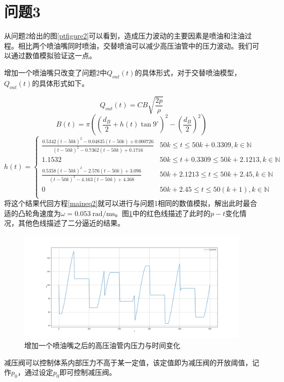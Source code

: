 \documentclass[12pt,AutoFakeBold]{article}%
\begin{document}
    \section{问题3}
    从问题2给出的图\ref{ptfigure2}可以看到，造成压力波动的主要因素是喷油和注油过程。相比两个喷油嘴同时喷油，交替喷油可以减少高压油管中的压力波动。我们可以通过数值模拟验证这一点。\par
    增加一个喷油嘴只改变了问题2中$Q_{out}(t)$的具体形式，对于交替喷油模型，$Q_{out}(t)$的具体形式如下。\par
    \begin{equation}
        Q_{out}(t)=CB\sqrt{\frac{2p}{\rho}}
    \end{equation}
    \begin{equation}
        B(t)=\pi\left(\left(\frac{d_B}{2}+h(t)\tan9^\circ\right)^2-\left(\frac{d_B}{2}\right)^2\right)
    \end{equation}
    \begin{equation}
        h(t)=
        \begin{cases}
            \frac{0.5342(t-50k)^2-0.04835(t-50k)+0.000726}{(t-50k)^2-0.7362(t-50k)+0.1716}&50k\leq t\leq 50k+0.3309,k\in\mathbb{N}\\
            1.1532&50k\leq t+0.3309\leq 50k+2.1213,k\in\mathbb{N}\\
            \frac{0.5358(t-50k)^2-2.576(t-50k)+3.096}{(t-50k)^2-4.163(t-50k)+4.368}&50k+2.1213\leq t\leq 50k+2.45,k\in\mathbb{N}\\
            0&50k+2.45\leq t\leq 50(k+1),k\in\mathbb{N}\\      
        \end{cases}
    \end{equation}
    将这个结果代回方程\ref{maineq2}就可以进行与问题1相同的数值模拟，解出此时最合适的凸轮角速度为$\omega=\SI{0.053}{\radian\per\ms}$。图\ref{ptfigure31}中的红色线描述了此时的$p-t$变化情况，其他色线描述了二分逼近的结果。\par
    \begin{figure}[H]
        \centering
        \includegraphics[scale=0.32]{figure/3-4.png}
        \caption{增加一个喷油嘴之后的高压油管内压力与时间变化}
        \label{ptfigure31}
    \end{figure}
    减压阀可以控制体系内部压力不高于某一定值，该定值即为减压阀的开放阈值，记作$p_0$，通过设定$p_0$即可控制减压阀。
\end{document}
